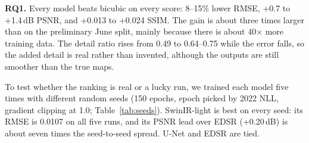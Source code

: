 \documentclass[conference]{IEEEtran}
\begin{document}
\begin{table}[htbp]
\caption{RQ1 and RQ2 on the 2023 test year (one run per model)}
\label{tab:final}
\centering\footnotesize
\setlength{\tabcolsep}{3pt}
\end{table}

\textbf{RQ1.} Every model beats bicubic on every score: 8--15\% lower RMSE, +0.7 to +1.4\,dB PSNR, and +0.013 to +0.024 SSIM. The gain is about three times larger than on the preliminary June split, mainly because there is about 40\(\times\) more training data. The detail ratio rises from 0.49 to 0.64--0.75 while the error falls, so the added detail is real rather than invented, although the outputs are still smoother than the true maps.

To test whether the ranking is real or a lucky run, we trained each model five times with different random seeds (150 epochs, epoch picked by 2022 NLL, gradient clipping at 1.0; Table~\ref{tab:seeds}). SwinIR-light is best on every seed: its RMSE is 0.0107 on all five runs, and its PSNR lead over EDSR (+0.20\,dB) is about seven times the seed-to-seed spread. U-Net and EDSR are tied.

\begin{table}[htbp]
\caption{RQ1 over five seeds (mean \(\pm\) std, 2023 test year)}
\label{tab:seeds}
\centering\footnotesize
\setlength{\tabcolsep}{3pt}
\end{table}
\end{document}
